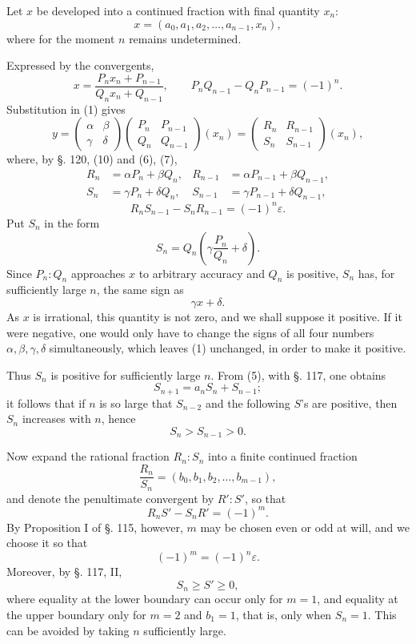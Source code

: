 \documentclass[11pt]{article}
\begin{document}
Let $x$ be developed into a continued fraction with final quantity $x_n$:
\[
\tag{2}        x=(a_0,a_1,a_2,\ldots,a_{n-1},x_n),
\]
where for the moment $n$ remains undetermined.

Expressed by the convergents,
\[
\tag{3}        x=\frac{P_nx_n+P_{n-1}}{Q_nx_n+Q_{n-1}},
        \qquad
        P_nQ_{n-1}-Q_nP_{n-1}=(-1)^n.
\]
Substitution in (1) gives
\[
\tag{4}
 y=\begin{pmatrix}\alpha&\beta\\ \gamma&\delta\end{pmatrix}
   \begin{pmatrix}P_n&P_{n-1}\\ Q_n&Q_{n-1}\end{pmatrix}(x_n)
 =\begin{pmatrix}R_n&R_{n-1}\\ S_n&S_{n-1}\end{pmatrix}(x_n),
\]
where, by §. 120, (10) and (6), (7),
\[
\tag{5}\begin{aligned}
R_n&=\alpha P_n+\beta Q_n,&
R_{n-1}&=\alpha P_{n-1}+\beta Q_{n-1},\\
S_n&=\gamma P_n+\delta Q_n,&
S_{n-1}&=\gamma P_{n-1}+\delta Q_{n-1},
\end{aligned}
\]
\[
\tag{6}        R_nS_{n-1}-S_nR_{n-1}=(-1)^n\varepsilon.
\]
Put $S_n$ in the form
\[
        S_n=Q_n\left(\gamma\frac{P_n}{Q_n}+\delta\right).
\]
Since $P_n:Q_n$ approaches $x$ to arbitrary accuracy and $Q_n$ is positive, $S_n$ has, for sufficiently large $n$, the same sign as
\[
        \gamma x+\delta.
\]
As $x$ is irrational, this quantity is not zero, and we shall suppose it positive. If it were negative, one would only have to change the signs of all four numbers $\alpha,\beta,\gamma,\delta$ simultaneously, which leaves (1) unchanged, in order to make it positive.

Thus $S_n$ is positive for sufficiently large $n$. From (5), with §. 117, one obtains
\[
        S_{n+1}=a_nS_n+S_{n-1};
\]
it follows that if $n$ is so large that $S_{n-2}$ and the following $S$'s are positive, then $S_n$ increases with $n$, hence
\[
\tag{7}        S_n>S_{n-1}>0.
\]

Now expand the rational fraction $R_n:S_n$ into a finite continued fraction
\[
\tag{8}        \frac{R_n}{S_n}=(b_0,b_1,b_2,\ldots,b_{m-1}),
\]
and denote the penultimate convergent by $R':S'$, so that
\[
\tag{9}        R_nS'-S_nR'=(-1)^m.
\]
By Proposition I of §. 115, however, $m$ may be chosen even or odd at will, and we choose it so that
\[
        (-1)^m=(-1)^n\varepsilon.
\]
Moreover, by §. 117, II,
\[
\tag{10}       S_n\ge S'\ge0,
\]
where equality at the lower boundary can occur only for $m=1$, and equality at the upper boundary only for $m=2$ and $b_1=1$, that is, only when $S_n=1$. This can be avoided by taking $n$ sufficiently large.
\end{document}
